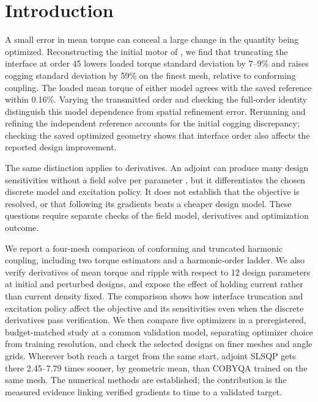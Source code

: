 \documentclass{anvil-paper}
\begin{document}
\section{Introduction}
A small error in mean torque can conceal a large change in the quantity
being optimized. Reconstructing the initial motor of
\citet{wiesheu2024spline}, we find that truncating the interface at order 45
lowers loaded torque standard deviation by 7--9\% and raises cogging
standard deviation by 59\% on the finest mesh, relative to conforming coupling. The loaded
mean torque of either model agrees with the saved reference within 0.16\%.
Varying the transmitted order and checking the full-order identity
distinguish this model dependence from spatial refinement error. Rerunning
and refining the independent reference accounts for the initial cogging
discrepancy; checking the saved optimized geometry shows that interface
order also affects the reported design improvement.

The same distinction applies to derivatives. An adjoint can produce many
design sensitivities without a field solve per parameter
\citep{scotzniovsky2025}, but it differentiates the chosen discrete model
and excitation policy. It does not establish that the objective is
resolved, or that following its gradients beats a cheaper design model.
These questions require separate checks of the field model, derivatives
and optimization outcome.

We report a four-mesh comparison of conforming and truncated harmonic
coupling, including two torque estimators and a harmonic-order ladder.
We also verify derivatives of mean torque and ripple with respect to
12 design parameters at initial and perturbed designs, and expose the
effect of holding current rather than current density fixed. The
comparison shows how interface truncation and excitation policy affect
the objective and its sensitivities even when the discrete derivatives pass
verification. We then compare five optimizers in a preregistered,
budget-matched study at a common validation model, separating optimizer
choice from training resolution, and check the selected designs on finer
meshes and angle grids. Wherever both reach a target from the same start,
adjoint SLSQP gets there 2.45--7.79 times sooner, by geometric mean, than
COBYQA trained on the same mesh. The numerical methods are established;
the contribution is the measured evidence linking verified gradients to
time to a validated target.
\end{document}
